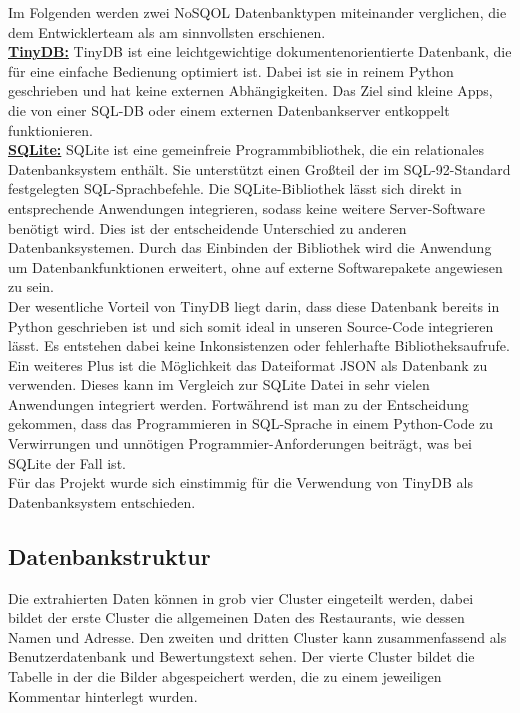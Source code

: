 \documentclass[a4paper,oneside,12pt]{report}
\begin{document}
					Im Folgenden werden zwei NoSQOL Datenbanktypen miteinander verglichen, die dem Entwicklerteam als am sinnvollsten erschienen.
					\\
					\newline
					\underline{\textbf{TinyDB:}}
					\newline TinyDB ist eine leichtgewichtige dokumentenorientierte Datenbank, die für eine einfache Bedienung optimiert ist. Dabei ist sie in reinem Python geschrieben und hat keine externen Abhängigkeiten. Das Ziel sind kleine Apps, die von einer SQL-DB oder einem externen Datenbankserver entkoppelt funktionieren. \cite{bib-tinydb}
					\\
					\newline					
					\underline{\textbf{SQLite:}}
					\newline SQLite ist eine gemeinfreie Programmbibliothek, die ein relationales Datenbanksystem enthält. Sie unterstützt einen Großteil der im SQL-92-Standard festgelegten SQL-Sprachbefehle. Die SQLite-Bibliothek lässt sich direkt in entsprechende Anwendungen integrieren, sodass keine weitere Server-Software benötigt wird. Dies ist der entscheidende Unterschied zu anderen Datenbanksystemen. Durch das Einbinden der Bibliothek wird die Anwendung um Datenbankfunktionen erweitert, ohne auf externe Softwarepakete angewiesen zu sein. \cite{bib-sqlite}
					\\
					\newline Der wesentliche Vorteil von TinyDB liegt darin, dass diese Datenbank bereits in Python geschrieben ist und sich somit ideal in unseren Source-Code integrieren lässt. Es entstehen dabei keine Inkonsistenzen oder fehlerhafte Bibliotheksaufrufe. Ein weiteres Plus ist die Möglichkeit das Dateiformat JSON als Datenbank zu verwenden. Dieses kann im Vergleich zur SQLite Datei in sehr vielen Anwendungen integriert werden. Fortwährend ist man zu der Entscheidung gekommen, dass das Programmieren in SQL-Sprache in einem Python-Code zu Verwirrungen und unnötigen Programmier-Anforderungen beiträgt, was bei SQLite der Fall ist.
					\\
					Für das Projekt wurde sich einstimmig für die Verwendung von TinyDB als Datenbanksystem entschieden.
					
							
			\subsection[Datenbankstruktur - Johannes Knippel]{Datenbankstruktur}
			
				Die extrahierten Daten können in grob vier Cluster eingeteilt werden, dabei bildet der erste Cluster die allgemeinen Daten des Restaurants, wie dessen Namen und Adresse. Den zweiten und dritten Cluster kann zusammenfassend als Benutzerdatenbank und Bewertungstext sehen. Der vierte Cluster bildet die Tabelle in der die Bilder abgespeichert werden, die zu einem jeweiligen Kommentar hinterlegt wurden.
				
\end{document}
